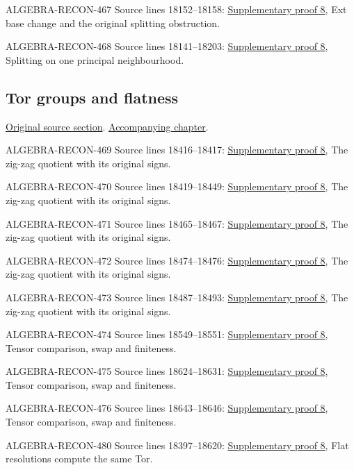 \begin{AlgebraSourceRoutes}
\item[ALGEBRA-RECON-467] Source lines 18152--18158: \hyperlink{algebra_depth_tor_projective_notes_20260927}{Supplementary proof 8}, Ext base change and the original splitting obstruction.
\item[ALGEBRA-RECON-468] Source lines 18141--18203: \hyperlink{algebra_depth_tor_projective_notes_20260927}{Supplementary proof 8}, Splitting on one principal neighbourhood.
\end{AlgebraSourceRoutes}

\subsection{Tor groups and flatness}
\hypertarget{algebra-source-section-tor}{}
\noindent\href{https://github.com/stacks/stacks-project/blob/a04446e57ec1fbc252a871afcec7752fb2807b14/algebra.tex\#L18215}{Original source section}. \href{algebra.pdf\#nameddest=section-tor}{Accompanying chapter}.

\begin{AlgebraSourceRoutes}
\item[ALGEBRA-RECON-469] Source lines 18416--18417: \hyperlink{algebra_depth_tor_projective_notes_20260927}{Supplementary proof 8}, The zig-zag quotient with its original signs.
\item[ALGEBRA-RECON-470] Source lines 18419--18449: \hyperlink{algebra_depth_tor_projective_notes_20260927}{Supplementary proof 8}, The zig-zag quotient with its original signs.
\item[ALGEBRA-RECON-471] Source lines 18465--18467: \hyperlink{algebra_depth_tor_projective_notes_20260927}{Supplementary proof 8}, The zig-zag quotient with its original signs.
\item[ALGEBRA-RECON-472] Source lines 18474--18476: \hyperlink{algebra_depth_tor_projective_notes_20260927}{Supplementary proof 8}, The zig-zag quotient with its original signs.
\item[ALGEBRA-RECON-473] Source lines 18487--18493: \hyperlink{algebra_depth_tor_projective_notes_20260927}{Supplementary proof 8}, The zig-zag quotient with its original signs.
\item[ALGEBRA-RECON-474] Source lines 18549--18551: \hyperlink{algebra_depth_tor_projective_notes_20260927}{Supplementary proof 8}, Tensor comparison, swap and finiteness.
\item[ALGEBRA-RECON-475] Source lines 18624--18631: \hyperlink{algebra_depth_tor_projective_notes_20260927}{Supplementary proof 8}, Tensor comparison, swap and finiteness.
\item[ALGEBRA-RECON-476] Source lines 18643--18646: \hyperlink{algebra_depth_tor_projective_notes_20260927}{Supplementary proof 8}, Tensor comparison, swap and finiteness.
\item[ALGEBRA-RECON-480] Source lines 18397--18620: \hyperlink{algebra_depth_tor_projective_notes_20260927}{Supplementary proof 8}, Flat resolutions compute the same Tor.
\end{AlgebraSourceRoutes}

